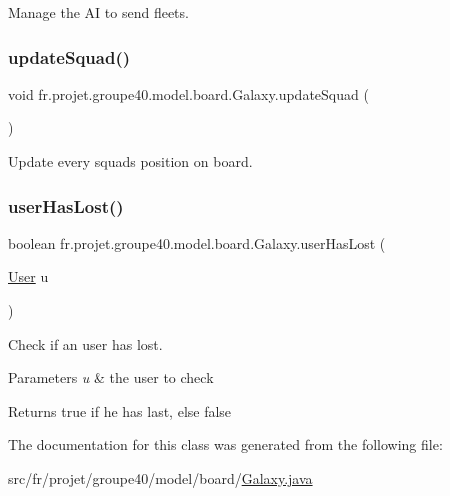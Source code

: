 Manage the AI to send fleets. 

\mbox{\label{classfr_1_1projet_1_1groupe40_1_1model_1_1board_1_1_galaxy_a94ac22bfc0d4692c0cb68290dafefb62}} 
\subsubsection{\texorpdfstring{update\+Squad()}{updateSquad()}}
{\footnotesize\ttfamily void fr.\+projet.\+groupe40.\+model.\+board.\+Galaxy.\+update\+Squad (\begin{DoxyParamCaption}{ }\end{DoxyParamCaption})}



Update every squads position on board. 

\mbox{\label{classfr_1_1projet_1_1groupe40_1_1model_1_1board_1_1_galaxy_a95097e70a3cdd31b4ac52821851183e3}} 
\subsubsection{\texorpdfstring{user\+Has\+Lost()}{userHasLost()}}
{\footnotesize\ttfamily boolean fr.\+projet.\+groupe40.\+model.\+board.\+Galaxy.\+user\+Has\+Lost (\begin{DoxyParamCaption}\item[{\hyperlink{classfr_1_1projet_1_1groupe40_1_1client_1_1_user}{User}}]{u }\end{DoxyParamCaption})}



Check if an user has lost. 


\begin{DoxyParams}{Parameters}
{\em u} & the user to check \\
\hline
\end{DoxyParams}
\begin{DoxyReturn}{Returns}
true if he has last, else false 
\end{DoxyReturn}


The documentation for this class was generated from the following file\+:\begin{DoxyCompactItemize}
\item 
src/fr/projet/groupe40/model/board/\hyperlink{_galaxy_8java}{Galaxy.\+java}\end{DoxyCompactItemize}
